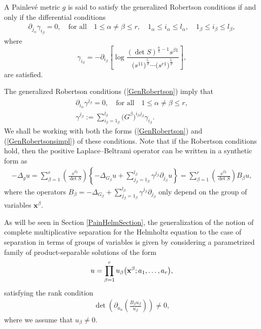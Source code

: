 \documentclass[pdftex]{sigma}
\numberwithin{equation}{section}
\newcommand{\ialpha}{i_{\alpha}}
\newcommand{\jbeta}{j_{\beta}}
\begin{document}
\begin{Definition} \label{defiRC}
A Painlev\'e metric $g$ is said to satisfy the generalized Robertson conditions if and only if the differential conditions
	\begin{gather}\label{GenRobertson}
\partial_{j_{\alpha}}\gamma_{i_{\beta}}=0,\quad \textrm{for all} \quad 1\leq \alpha \neq \beta \leq r, \quad 1_{\alpha}\leq i_{\alpha} \leq l_{\alpha},\quad 1_{\beta}\leq i_{\beta} \leq l_{\beta},
\end{gather}
where
\[
\gamma_{i_{\beta}}=-\partial_{i_{\beta}}\left[\log \frac{(\det S)^{\frac{n}{2}-1}s^{\beta 1}}{\big(s^{11}\big)^{\frac{l_1}{2}} \cdots \big(s^{r1}\big)^{\frac{l_r}{2}}}\right],
\]
are satisfied.
\end{Definition}
The generalized Robertson conditions (\ref{GenRobertson}) imply that
\begin{gather}\label{GenRobertsonsimpl}
\partial_{\ialpha}\gamma^{\jbeta}=0, \quad \textrm{for all} \quad 1\leq \alpha \neq \beta \leq r,\\
\label{gammaup}
\gamma^{j_{\beta}}:= \sum_{i_{\beta}=1_{\beta}}^{l_{\beta}}\big(G^{\beta}\big)^{i_{\beta}j_{\beta}} \gamma_{i_{\beta}}.
\end{gather}
We shall be working with both the forms (\ref{GenRobertson}) and (\ref{GenRobertsonsimpl}) of these conditions. Note that if the Robertson conditions hold, then the positive Laplace--Beltrami operator can be written in a synthetic form as
\begin{gather*}%
 -\Delta_{g} u  =   \sum_{\beta=1}^{r} \left(\frac{s^{\beta 1}}{\det S}\right)\left\{-\Delta_{G_{\beta}}u + \sum_{{j}_{\beta}=1_{\beta}}^{l_{\beta}} \gamma^{j_{\beta}} \partial_{j_{\beta}}u\right\}
   =   \sum_{\beta=1}^{r} \left(\frac{s^{\beta 1}}{\det S}\right) B_\beta u , \nonumber
\end{gather*}
where the operators $B_\beta = -\Delta_{G_{\beta}} + \sum\limits_{{j}_{\beta}=1_{\beta}}^{l_{\beta}} \gamma^{j_{\beta}} \partial_{j_{\beta}}$ only depend on the group of variables $\textbf{x}^\beta$.

As will be seen in Section \ref{PainHelmSection}, the generalization of the notion of complete multiplicative separation for the Helmholtz equation to the case of separation in terms of groups of variables is given by considering a parametrized family of product-separable solutions of the form
\begin{gather} \label{SeparabilitySchro}
u=\prod_{\beta =1}^{r}u_{\beta}\big({\bf x}^{\beta};a_{1},\dots,a_{r}\big),
\end{gather}
satisfying the rank condition
\begin{gather} \label{RankPainSchro}
 \det  \left( \partial_{a_\alpha} \left( \frac{B_\beta u_\beta}{u_\beta} \right) \right) \ne 0,
\end{gather}
where we assume that $u_{\beta}\neq 0$.
\end{document}
